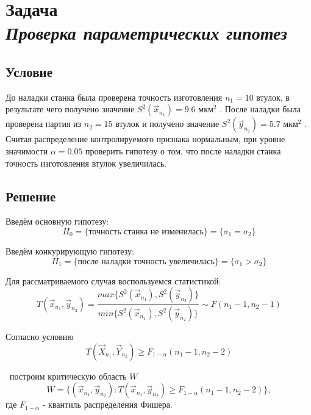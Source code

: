 \section*{Задача \\\textit{Проверка параметрических гипотез}}

\subsection*{Условие}
До наладки станка была проверена точность изготовления $n_1 = 10$ втулок,
в результате чего получено значение $S^2 {(\vec x_{n_1})} = 9.6$ мкм$^2$ . После наладки была проверена
партия из $n_2 = 15$ втулок и получено значение $S^2 {(\vec y_{n_2})} = 5.7$ мкм$^2$ . Считая распределение контролируемого признака нормальным, при уровне значимости $\alpha = 0.05$ проверить гипотезу о том, что после наладки станка точность изготовления втулок увеличилась.

\subsection*{Решение}

Введём основную гипотезу:
\begin{equation*}
    H_0 = \{ \text{точность станка не изменилась} \} = \{ \sigma_1 = \sigma_2\}
\end{equation*}

Введём конкурирующую гипотезу:
\begin{equation*}
    H_1 = \{ \text{после наладки точность увеличилась} \} = \{ \sigma_1 > \sigma_2\}
\end{equation*}

Для рассматриваемого случая воспользуемся статистикой:
\begin{equation*}
    T(\vec x_{n_1}, \vec y_{n_2}) = \frac{max\{{S}^2(\vec x_{n_1}), {S}^2(\vec y_{n_2})\}}
    {min\{{S}^2(\vec x_{n_1}), {S}^2(\vec y_{n_2})\}} \sim F(n_1 - 1, n_2 - 1)
\end{equation*}

Согласно условию
\begin{equation*}
    T(\vec X_{n_1}, \vec Y_{n_2}) \geq F_{1 - \alpha}(n_1 - 1, n_2 - 2)
\end{equation*}

 построим критическую область $W$
\begin{equation*}
    W = \{(\vec x_{n_1}, \vec y_{n_2}) : 
    T(\vec x_{n_1}, \vec y_{n_2}) \geq F_{1 - \alpha}(n_1 - 1, n_2 - 2) \},
\end{equation*}
где $F_{1- \alpha}$ - квантиль распределения Фишера.

